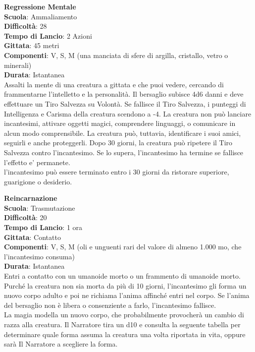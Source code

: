 \begin{multicols}{2}
\medskip\textbf{Regressione Mentale}\\
\textbf{Scuola}: Ammaliamento\\
\textbf{Difficoltà}: 28\\
\textbf{Tempo di Lancio}: 2 Azioni\\
\textbf{Gittata}: 45 metri\\
\textbf{Componenti}: V, S, M (una manciata di sfere di argilla, cristallo, vetro o minerali)\\
\textbf{Durata}: Istantanea\\
Assalti la mente di una creatura a gittata e che puoi vedere, cercando di frammentarne l'intelletto e la personalità. Il bersaglio subisce 4d6 danni e deve effettuare un Tiro Salvezza su Volontà. Se fallisce il Tiro Salvezza, i punteggi di Intelligenza e Carisma della creatura scendono a -4. La creatura non può lanciare incantesimi, attivare oggetti magici, comprendere linguaggi, o comunicare in alcun modo comprensibile. La creatura può, tuttavia, identificare i suoi amici, seguirli e anche proteggerli. Dopo 30 giorni, la creatura può ripetere il Tiro Salvezza contro l'incantesimo. Se lo supera, l'incantesimo ha termine se fallisce l'effetto e' permanete.\\ 
l'incantesimo può essere terminato entro i 30 giorni da ristorare superiore, guarigione o desiderio.

\medskip\textbf{Reincarnazione}\\
\textbf{Scuola}: Trasmutazione\\
\textbf{Difficoltà}: 20\\
\textbf{Tempo di Lancio}: 1 ora\\
\textbf{Gittata}: Contatto\\
\textbf{Componenti}: V, S, M (oli e unguenti rari del valore di almeno 1.000 mo, che l'incantesimo consuma)\\
\textbf{Durata}: Istantanea\\
Entri a contatto con un umanoide morto o un frammento di umanoide morto. Purché la creatura non sia morta da più di 10 giorni, l'incantesimo gli forma un nuovo corpo adulto e poi ne richiama l'anima affinché entri nel corpo. Se l'anima del bersaglio non è libera o consenziente a farlo, l'incantesimo fallisce.\\
La magia modella un nuovo corpo, che probabilmente provocherà un cambio di razza alla creatura. Il Narratore tira un d10 e consulta la seguente tabella per determinare quale forma assuma la creatura una volta riportata in vita, oppure sarà Il Narratore a scegliere la forma.\\


\end{multicols}
